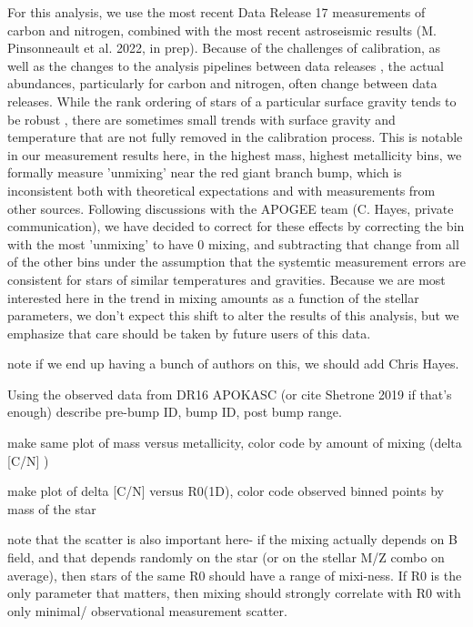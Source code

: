 \documentclass[linenumbers,twocolumn]{aastex62}
\begin{document}
For this analysis, we use the most recent Data Release 17 \citep{DR17} measurements of carbon and nitrogen, combined with the most recent astroseismic results (M. Pinsonneault et al. 2022, in prep). Because of the challenges of calibration, as well as the changes to the analysis pipelines between data releases \citep[see e.g.]{Holtzman2018,Jonsson2020, vsmith_apogee_dr16_2021 }, the actual abundances, particularly for carbon and nitrogen, often change between data releases. While the rank ordering of stars of a particular surface gravity tends to be robust \citep{Martig2016,Ness2016}, there are sometimes small trends with surface gravity and temperature that are not fully removed in the calibration process. This is notable in our measurement results here, in the highest mass, highest metallicity bins, we formally measure 'unmixing' near the red giant branch bump, which is inconsistent both with theoretical expectations and with measurements from other sources. Following discussions with the APOGEE team (C. Hayes, private communication), we have decided to correct for these effects by correcting the bin with the most 'unmixing' to have 0 mixing, and subtracting that change from all of the other bins under the assumption that the systemtic measurement errors are consistent for stars of similar temperatures and gravities. Because we are most interested here in the trend in mixing amounts as a function of the stellar parameters, we don't expect this shift to alter the results of this analysis, but we emphasize that care should be taken by future users of this data. 

note if we end up having a bunch of authors on this, we should add Chris Hayes. 





Using the observed data from DR16 APOKASC (or cite Shetrone 2019 if that's enough) describe pre-bump ID, bump ID, post bump range. 

make same plot of mass versus metallicity, color code by amount of mixing (delta [C/N] ) 

make plot of delta [C/N] versus R0(1D), color code observed binned points by mass of the star

note that the scatter is also important here- if the mixing actually depends on B field, and that depends randomly on the star (or on the stellar M/Z combo on average), then stars of the same R0 should have a range of mixi-ness. If R0 is the only parameter that matters, then mixing should strongly correlate with R0 with only minimal/ observational measurement scatter. 
\end{document}
